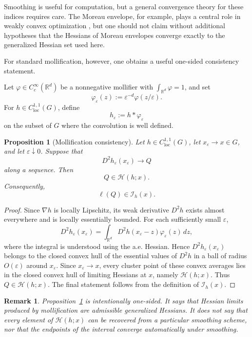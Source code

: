 \documentclass[11pt]{article}
\numberwithin{equation}{section}
\newtheorem{proposition}[theorem]{Proposition}
\newtheorem{remark}[theorem]{Remark}
\newcommand{\R}{\mathbb R}
\newcommand{\Hess}{\mathcal H}
\begin{document}
	Smoothing is useful for computation, but a general convergence theory for these indices requires care. The Moreau envelope, for example, plays a central role in weakly convex optimization \cite{davis2019,perezaros2021,denggao2025}, but one should not claim without additional hypotheses that the Hessians of Moreau envelopes converge exactly to the generalized Hessian set used here.
	
	For standard mollification, however, one obtains a useful one-sided consistency statement.
	
	Let \(\varphi\in C_c^\infty(\R^d)\) be a nonnegative mollifier with \(\int_{\R^d}\varphi=1\), and set
	\[
	\varphi_\varepsilon(z)
	:=
	\varepsilon^{-d}\varphi(z/\varepsilon).
	\]
	For \(h\in C^{1,1}_{\mathrm{loc}}(G)\), define
	\[
	h_\varepsilon
	:=
	h*\varphi_\varepsilon
	\]
	on the subset of \(G\) where the convolution is well defined.
	
	\begin{proposition}[Mollification consistency]
		\label{prop:mollification}
		Let \(h\in C^{1,1}_{\mathrm{loc}}(G)\), let \(x_\varepsilon\to x\in G\), and let \(\varepsilon\downarrow0\). Suppose that
		\[
		D^2h_\varepsilon(x_\varepsilon)\to Q
		\]
		along a sequence. Then
		\[
		Q\in\Hess(h;x).
		\]
		Consequently,
		\[
		\ell(Q)\in \mathcal I_h(x).
		\]
	\end{proposition}
	
	\begin{proof}
		Since \(\nabla h\) is locally Lipschitz, its weak derivative \(D^2h\) exists almost everywhere and is locally essentially bounded. For each sufficiently small \(\varepsilon\),
		\[
		D^2h_\varepsilon(x_\varepsilon)
		=
		\int_{\R^d} D^2h(x_\varepsilon-z)\varphi_\varepsilon(z)\,dz,
		\]
		where the integral is understood using the a.e. Hessian. Hence \(D^2h_\varepsilon(x_\varepsilon)\) belongs to the closed convex hull of the essential values of \(D^2h\) in a ball of radius \(O(\varepsilon)\) around \(x_\varepsilon\). Since \(x_\varepsilon\to x\), every cluster point of these convex averages lies in the closed convex hull of limiting Hessians at \(x\), namely \(\Hess(h;x)\). Thus \(Q\in\Hess(h;x)\). The final statement follows from the definition of \(\mathcal I_h(x)\).
	\end{proof}
	
	\begin{remark}
		Proposition~\ref{prop:mollification} is intentionally one-sided. It says that Hessian limits produced by mollification are admissible generalized Hessians. It does not say that every element of \(\Hess(h;x)\) can be recovered from a particular smoothing scheme, nor that the endpoints of the interval converge automatically under smoothing.
	\end{remark}
	
\end{document}
